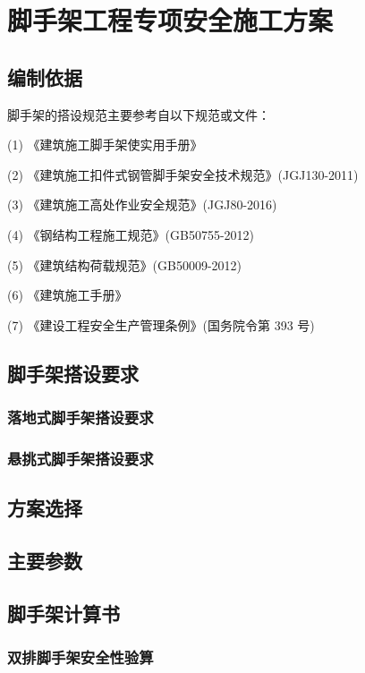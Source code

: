 \section{脚手架工程专项安全施工方案}
\subsection{编制依据}

脚手架的搭设规范主要参考自以下规范或文件：

(1) 《建筑施工脚手架使实用手册》

(2) 《建筑施工扣件式钢管脚手架安全技术规范》(JGJ130-2011)

(3) 《建筑施工高处作业安全规范》(JGJ80-2016)

(4) 《钢结构工程施工规范》(GB50755-2012)

(5) 《建筑结构荷载规范》(GB50009-2012)

(6) 《建筑施工手册》

(7) 《建设工程安全生产管理条例》(国务院令第 393 号)

\subsection{脚手架搭设要求}
\subsubsection{落地式脚手架搭设要求}

\subsubsection{悬挑式脚手架搭设要求}

\subsection{方案选择}

\subsection{主要参数}

\subsection{脚手架计算书}
\subsubsection{双排脚手架安全性验算}

